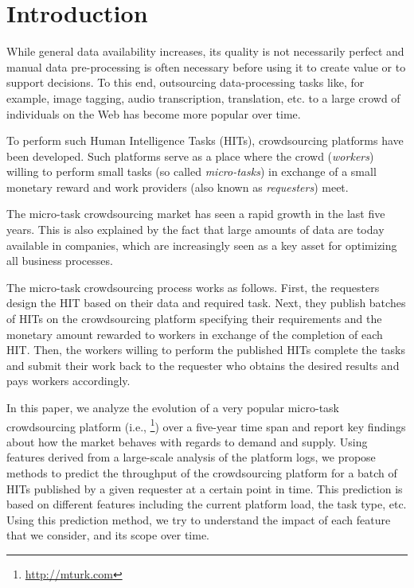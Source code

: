 \section{Introduction}\label{sec:intro}
% 
While general data availability increases, its quality is not necessarily perfect and manual data pre-processing is often necessary before using it to create value or to support decisions.
% 
To this end, outsourcing  data-processing tasks like, for example, image tagging, audio transcription, translation, etc. to a large crowd of individuals on the Web has become more popular over time.

To perform such Human Intelligence Tasks (HITs), crowdsourcing platforms have been developed. Such platforms serve as a place where the crowd (\emph{workers}) willing to perform small tasks (so called \emph{micro-tasks}) in exchange of a small monetary reward and work providers (also known as \emph{requesters}) meet. 

The micro-task crowdsourcing market has seen a rapid growth in the last five years. This is also explained by the fact that large amounts of data are today available in companies, which are increasingly seen as a key asset for optimizing all business processes.

The  micro-task crowdsourcing process works as follows. First, the requesters design the HIT based on their data and required task. Next, they publish batches of HITs on the crowdsourcing platform specifying their requirements and the monetary amount rewarded to workers in exchange of the completion of each HIT. Then, the workers willing to perform the published HITs complete the tasks and submit their work back to the requester who obtains the desired results and pays workers accordingly.

In this paper, we analyze the evolution of a very popular micro-task crowdsourcing platform (i.e., \amt{}\footnote{\url{http://mturk.com}}) over a  five-year time span and report key findings about how
the market behaves with regards to demand and supply.
% 
Using features derived from a large-scale analysis of the platform logs, we propose methods to predict the throughput of the crowdsourcing platform for a batch of HITs published by a given requester at a certain point in time. This prediction is based on different features including the current platform load, the task type, etc. Using this prediction method, we try to understand the impact of each feature that we consider, and its scope over time.

